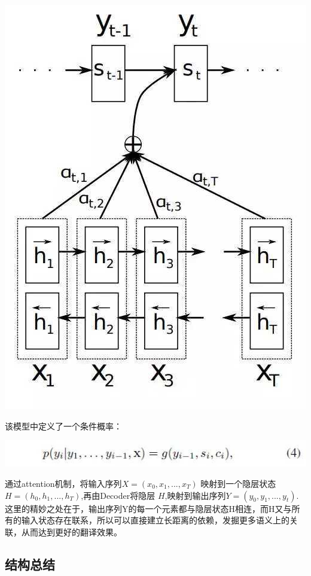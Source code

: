 \documentclass[UTF8,a4paper,10pt]{ctexart}
\begin{document}
    \centerline{\includegraphics[scale=0.3]{pics/190417-s3.jpg}}
    
    
  
    该模型中定义了一个条件概率：

    \centerline{\includegraphics[scale=0.6]{pics/190417-s2.jpg}}
    
    通过attention机制，将输入序列$X =(x_0, x_1, ...,x_T)$ 映射到一个隐层状态$H=(h_0, h_1, ...,h_T)$,再由Decoder将隐层 $H$,映射到输出序列$Y=  (y_0, y_1, ...,y_t)$.这里的精妙之处在于，输出序列Y的每一个元素都与隐层状态H相连，而H又与所有的输入状态存在联系，所以可以直接建立长距离的依赖，发掘更多语义上的关联，从而达到更好的翻译效果。

    \subsection{结构总结}
    
\end{document}
